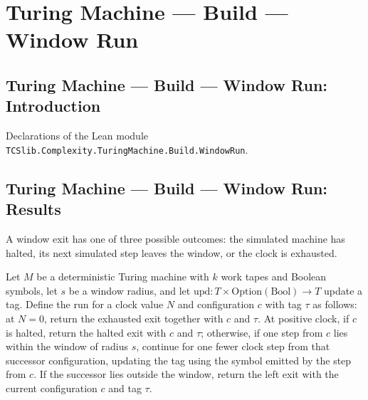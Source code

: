 \section{Turing Machine --- Build --- Window Run}
\subsection*{Turing Machine --- Build --- Window Run: Introduction}

Declarations of the Lean module \texttt{TCSlib.Complexity.TuringMachine.Build.WindowRun}.

\subsection*{Turing Machine --- Build --- Window Run: Results}

\begin{definition}
\label{Turing.WindowExit}
\leanok
A window exit has one of three possible outcomes: the simulated machine has halted, its
next simulated step leaves the window, or the clock is exhausted.
\end{definition}

\begin{definition}
\label{Turing.windowRun}
\leanok
{}
Let $M$ be a deterministic Turing machine with $k$ work tapes and Boolean symbols, let
$s$ be a window radius, and let $\mathrm{upd}:T\times\mathrm{Option}(\mathrm{Bool})\to
T$ update a tag. Define the run for a clock value $N$ and configuration $c$ with tag
$\tau$ as follows: at $N=0$, return the exhausted exit together with $c$ and $\tau$. At
positive clock, if $c$ is halted, return the halted exit with $c$ and $\tau$; otherwise,
if one step from $c$ lies within the window of radius $s$, continue for one fewer clock
step from that successor configuration, updating the tag using the symbol emitted by the
step from $c$. If the successor lies outside the window, return the left exit with the
current configuration $c$ and tag $\tau$.
\end{definition}

